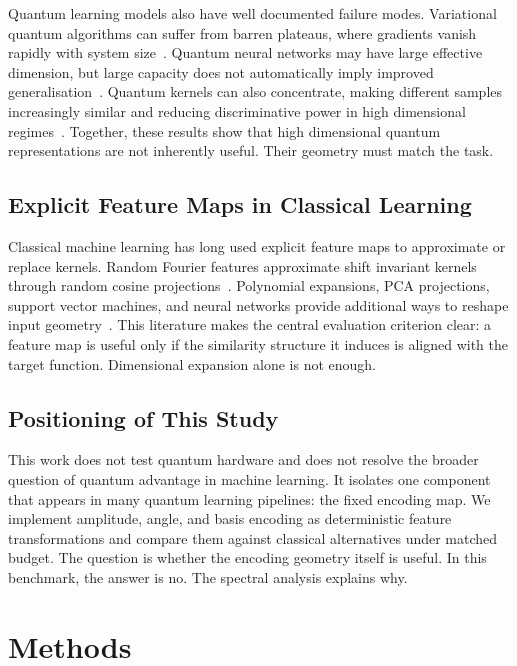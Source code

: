 \documentclass[12pt]{article}
\begin{document}
Quantum learning models also have well documented failure modes. Variational
quantum algorithms can suffer from barren plateaus, where gradients vanish
rapidly with system size~\citep{cerezo2021}. Quantum neural networks may have
large effective dimension, but large capacity does not automatically imply
improved generalisation~\citep{abbas2021}. Quantum kernels can also
concentrate, making different samples increasingly similar and reducing
discriminative power in high dimensional regimes~\citep{thanasilp2024}.
Together, these results show that high dimensional quantum representations are
not inherently useful. Their geometry must match the task.

\subsection{Explicit Feature Maps in Classical Learning}

Classical machine learning has long used explicit feature maps to approximate
or replace kernels. Random Fourier features approximate shift invariant kernels
through random cosine projections~\citep{rahimi2007}. Polynomial expansions,
PCA projections, support vector machines, and neural networks provide additional
ways to reshape input geometry~\citep{scholkopf2002}. This literature makes the
central evaluation criterion clear: a feature map is useful only if the
similarity structure it induces is aligned with the target function.
Dimensional expansion alone is not enough.

\subsection{Positioning of This Study}

This work does not test quantum hardware and does not resolve the broader
question of quantum advantage in machine learning. It isolates one component
that appears in many quantum learning pipelines: the fixed encoding map. We
implement amplitude, angle, and basis encoding as deterministic feature
transformations and compare them against classical alternatives under matched
budget. The question is whether the encoding geometry itself is useful. In this
benchmark, the answer is no. The spectral analysis explains why.

\section{Methods}
\label{sec:methods}
\end{document}
